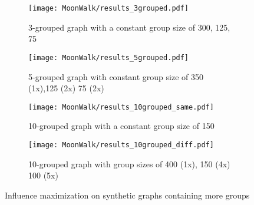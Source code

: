 \begin{center}
\begin{minipage}{0.8\textwidth}
    \begin{figure}[H]
  \begin{subfigure}[H]{0.475\textwidth}
    \texttt{[image: MoonWalk/results\_3grouped.pdf]}
    \caption{3-grouped graph with a constant group size of 300, 125, 75}
    \label{fig:6a}
  \end{subfigure}\hfill
  \begin{subfigure}[H]{0.475\textwidth}
    \texttt{[image: MoonWalk/results\_5grouped.pdf]}
    \caption{5-grouped graph with constant group size of 350 (1x),125 (2x) 75 (2x)}
    \label{fig:6b}
  \end{subfigure}\hfill
  \begin{subfigure}[H]{0.475\textwidth}
    \texttt{[image: MoonWalk/results\_10grouped\_same.pdf]}
    \caption{10-grouped graph with a constant group size of 150}
    \label{fig:6c}
  \end{subfigure}\hfill
  \begin{subfigure}[H]{0.475\textwidth}
    \texttt{[image: MoonWalk/results\_10grouped\_diff.pdf]}
    \caption{10-grouped graph with group sizes of 400 (1x), 150 (4x) 100 (5x)}
    \label{fig:6d}
  \end{subfigure}
  \caption{Influence maximization on synthetic graphs containing more groups} 
  \label{fig:6}
\end{figure}
\end{minipage}
\end{center}
